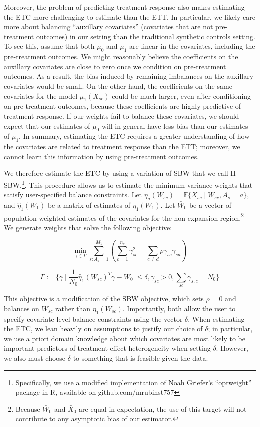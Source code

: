 \documentclass[12pt]{article}
\begin{document}
Moreover, the problem of predicting treatment response also makes estimating the ETC more challenging to estimate than the ETT. In particular, we likely care more about balancing ``auxillary covariates'' (covariates that are not pre-treatment outcomes) in our setting than the traditional synthetic controls setting. To see this, assume that both $\mu_0$ and $\mu_1$ are linear in the covariates, including the pre-treatment outcomes. We might reasonably believe the coefficients on the auxillary covariates are close to zero once we condition on pre-treatment outcomes. As a result, the bias induced by remaining imbalances on the auxillary covariates would be small. On the other hand, the coefficients on the same covariates for the model $\mu_1(X_{sc})$ could be much larger, even after conditioning on pre-treatment outcomes, because these coefficients are highly predictive of treatment response. If our weights fail to balance these covariates, we should expect that our estimates of $\mu_0$ will in general have less bias than our estimates of $\mu_1$. In summary, estimating the ETC requires a greater understanding of how the covariates are related to treatment response than the ETT; moreover, we cannot learn this information by using pre-treatment outcomes.

We therefore estimate the ETC by using a variation of SBW that we call H-SBW.\footnote{Specifically, we use a modified implementation of Noah Griefer's ``optweight'' package in R, available on github.com/mrubinst757}. This procedure allows us to estimate the minimum variance weights that satisfy user-specified balance constraints. Let $\eta_a(W_{sc}) = \mathbb{E}\{X_{sc} \mid W_{sc}, A_s = a\}$, and $\hat{\eta}_1(W_1)$ be a matrix of estimates of $\eta_1(W_1)$. Let $\bar{W}_0$ be a vector of population-weighted estimates of the covariates for the non-expansion region.\footnote{Because $\bar{W}_0$ and $\bar{X}_0$ are equal in expectation, the use of this target will not contribute to any asymptotic bias of our estimator.} We generate weights that solve the following objective:

$$
\min_{\gamma \in \Gamma} \sum_{s: A_s = 1}^{M_1}(\sum_{c = 1}^{n_s} \gamma_{sc}^2 + \sum_{c \ne d}\rho \gamma_{sc}\gamma_{sd})
$$

$$
\Gamma := \{\gamma \mid \frac{1}{N_0}\hat{\eta}_1(W_{sc})^T\gamma - \bar{W}_0 \mid \le \delta, \gamma_{sc} > 0, \sum_{sc}\gamma_{s,c} = N_0\}
$$

This objective is a modification of the SBW objective, which sets $\rho = 0$ and balances on $W_{sc}$ rather than $\eta_1(W_{sc})$. Importantly, both allow the user to specify covariate-level balance constraints using the vector $\delta$. When estimating the ETC, we lean heavily on assumptions to justify our choice of $\delta$; in particular, we use a priori domain knowledge about which covariates are most likely to be important predictors of treatment effect heterogeneity when setting $\delta$. However, we also must choose $\delta$ to something that is feasible given the data. 
\end{document}
